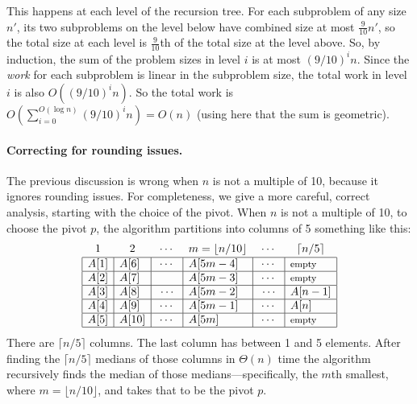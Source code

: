 This happens at each level of the recursion tree.
For each subproblem of any size $n'$,
its two subproblems on the level below have combined size at most $\frac{9}{10} n'$,
so the total size at each level is $\frac{9}{10}$th of the total size at the level above.
So, by induction, the sum of the problem sizes in level $i$ is at most $(9/10)^i n$.
Since the \emph{work} for each subproblem is linear in the subproblem size,
the total work in level $i$ is also $O((9/10)^i n)$.
So the total work is $O(\sum_{i=0}^{O(\log n)} (9/10)^i n) = O(n)$
(using here that the sum is geometric).

\paragraph{Correcting for rounding issues.}
The previous discussion is wrong when $n$ is not a multiple of 10,
because it ignores rounding issues.
For completeness, we give a more careful, correct analysis,
starting with the choice of the pivot.
When $n$ is not a multiple of 10, to choose the pivot $p$,
the algorithm partitions into columns of 5 something like this:
\[
  \begin{array}{|l|l|c|l|c|l|}
    \multicolumn{1}{c}{1} & \multicolumn{1}{c}{2}
                & \multicolumn{1}{c}{\cdots} & \multicolumn{1}{c}{m=\lfloor n/10\rfloor}
                               & \multicolumn{1}{c}{\cdots} & \multicolumn{1}{c}{\lceil n/5\rceil}
                                                              \\[1pt]\hline
    A[1] & A[6] &\cdots&A[5m-4]&\cdots&\text{\footnotesize{empty}}\\\hline 
    A[2] & A[7] &&A[5m-3]&\cdots&\text{\footnotesize{empty}}\\\hline 
    A[3] & A[8] &~\cdots~&{A[5m-2]}&~\cdots~&A[n-1]\\\hline 
    A[4] & A[9] &\cdots&A[5m-1]&\cdots&A[n]\\\hline 
    A[5] & A[10] &\cdots&A[5 m]&\cdots&\text{\footnotesize{empty}}\\\hline
  \end{array}
\]
There are $\lceil n/5\rceil$ columns.
The last column has between 1 and 5 elements.
After finding the $\lceil n/5\rceil$ medians of those columns in $\Theta(n)$ time
the algorithm recursively finds the median
of those medians---specifically, the $m$th smallest, where $m=\lfloor n/10 \rfloor$,
and takes that to be the pivot $p$.

